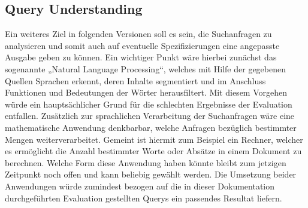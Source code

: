 \subsection{Query Understanding}
Ein weiteres Ziel in folgenden Versionen soll es sein,
die Suchanfragen zu analysieren
und somit auch auf eventuelle Spezifizierungen
eine angepasste Ausgabe geben zu können.
Ein wichtiger Punkt wäre hierbei zunächst
das sogenannte „Natural Language Processing“,
welches mit Hilfe der gegebenen Quellen Sprachen erkennt,
deren Inhalte segmentiert und im Anschluss Funktionen
und Bedeutungen der Wörter herausfiltert.
Mit diesem Vorgehen würde ein hauptsächlicher Grund
für die schlechten Ergebnisse der Evaluation entfallen.
Zusätzlich zur sprachlichen Verarbeitung der Suchanfragen
wäre eine mathematische Anwendung denkbarbar,
welche Anfragen bezüglich bestimmter Mengen weiterverarbeitet.
Gemeint ist hiermit zum Beispiel ein Rechner,
welcher es ermöglicht die Anzahl bestimmter Worte oder Absätze
in einem Dokument zu berechnen. Welche Form diese Anwendung haben
könnte bleibt zum jetzigen Zeitpunkt noch offen und kann beliebig gewählt werden.
Die Umsetzung beider Anwendungen würde zumindest bezogen auf die in dieser
Dokumentation durchgeführten Evaluation gestellten Querys ein passendes Resultat liefern.

